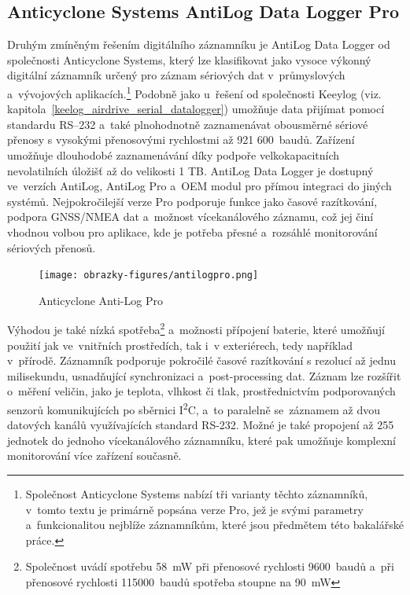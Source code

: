 \subsection{Anticyclone Systems AntiLog Data Logger Pro}
\label{anticyclone_systems_antilog_data_logger}
Druhým zmíněným řešením digitálního záznamníku je AntiLog Data Logger od společnosti Anticyclone Systems, který lze klasifikovat jako vysoce výkonný digitální záznamník určený pro záznam sériových dat v~průmyslových a~vývojových aplikacích.\footnote{Společnost Anticyclone Systems nabízí tři varianty těchto záznamníků, v~tomto textu je primárně popsána verze Pro, jež je svými parametry a~funkcionalitou nejblíže záznamníkům, které jsou předmětem této bakalářské práce.} Podobně jako u~řešení od společnosti Keeylog (viz. kapitola~\ref{keelog_airdrive_serial_datalogger}) umožňuje data přijímat pomocí standardu RS--232 a~také plnohodnotně zaznamenávat obousměrné sériové přenosy s vysokými přenosovými rychlostmi až 921 600~baudů. Zařízení umožňuje dlouhodobé zaznamenávání díky podpoře velkokapacitních nevolatilních úložišť až do velikosti 1 TB. AntiLog Data Logger je dostupný ve~verzích AntiLog, AntiLog Pro a~OEM modul pro přímou integraci do jiných systémů. Nejpokročilejší verze Pro podporuje funkce jako časové razítkování, podpora GNSS/NMEA dat a~možnost vícekanálového záznamu, což jej činí vhodnou volbou pro aplikace, kde je potřeba přesné a~rozsáhlé monitorování sériových přenosů.~\cite{anticyclone_systems_antilog_pro}

\begin{figure}[h]
    \centering
    \texttt{[image: obrazky-figures/antilogpro.png]}
    
    \caption{Anticyclone Anti-Log Pro~\cite{anticyclone_systems_antilog_pro_price}}
    \label{fig:antilog-pro}
\end{figure}

Výhodou je také nízká spotřeba\footnote{Společnost uvádí spotřebu \SI{58}{\milli\watt} při přenosové rychlosti 9600~baudů a~při přenosové rychlosti 115000~baudů spotřeba stoupne na \SI{90}{\milli\watt}} a~možnosti přípojení baterie, které umožňují použití jak ve~vnitřních prostředích, tak i~v exteriérech, tedy například v~přírodě. Záznamník podporuje pokročilé časové razítkování s rezolucí až jednu milisekundu, usnadňující synchronizaci a~post-processing dat. Záznam lze rozšířit o~měření veličin, jako je teplota, vlhkost či tlak, prostřednictvím podporovaných senzorů komunikujících po sběrnici I\textsuperscript{2}C, a~to paralelně se~záznamem až dvou datových kanálů využívajících standard RS-232. Možné je také propojení až 255 jednotek do jednoho vícekanálového záznamníku, které pak umožňuje komplexní monitorování více zařízení současně.~\cite{anticyclone_systems_antilog_pro, anticyclone_systems_antilog_pro_extended_logging}

